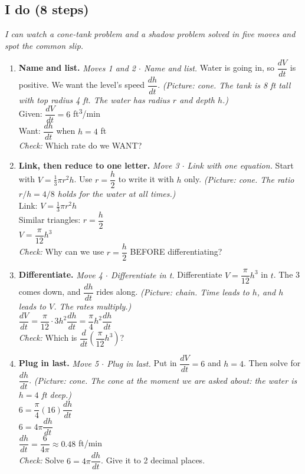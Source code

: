 \documentclass[11pt]{article}
\begin{document}
\subsection*{I do (8 steps)}
\textit{I can watch a cone-tank problem and a shadow problem solved in five moves and spot the common slip.}\par
\begin{enumerate}
\item \textbf{Name and list.} \textit{Moves 1 and 2 $\cdot$ Name and list.} Water is going in, so $\dfrac{dV}{dt}$ is positive. We want the level's speed $\dfrac{dh}{dt}$. \textit{(Picture: cone. The tank is 8 ft tall with top radius 4 ft. The water has radius $r$ and depth $h$.)}\\ Given: $\dfrac{dV}{dt}=6$ ft\textsuperscript{3}/min\\ Want: $\dfrac{dh}{dt}$ when $h=4$ ft\\ \textit{Check:} Which rate do we WANT? 
\item \textbf{Link, then reduce to one letter.} \textit{Move 3 $\cdot$ Link with one equation.} Start with $V=\tfrac13\pi r^2h$. Use $r=\dfrac h2$ to write it with $h$ only. \textit{(Picture: cone. The ratio $r/h=4/8$ holds for the water at all times.)}\\ Link: $V=\tfrac13\pi r^2h$\\ Similar triangles: $r=\dfrac h2$\\ $V=\dfrac{\pi}{12}h^3$\\ \textit{Check:} Why can we use $r=\dfrac h2$ BEFORE differentiating? 
\item \textbf{Differentiate.} \textit{Move 4 $\cdot$ Differentiate in t.} Differentiate $V=\dfrac{\pi}{12}h^3$ in $t$. The 3 comes down, and $\dfrac{dh}{dt}$ rides along. \textit{(Picture: chain. Time leads to $h$, and $h$ leads to $V$. The rates multiply.)}\\ $\dfrac{dV}{dt}=\dfrac{\pi}{12}\cdot3h^2\dfrac{dh}{dt}=\dfrac{\pi}{4}h^2\dfrac{dh}{dt}$\\ \textit{Check:} Which is $\dfrac{d}{dt}\left(\dfrac{\pi}{12}h^3\right)$? 
\item \textbf{Plug in last.} \textit{Move 5 $\cdot$ Plug in last.} Put in $\dfrac{dV}{dt}=6$ and $h=4$. Then solve for $\dfrac{dh}{dt}$. \textit{(Picture: cone. The cone at the moment we are asked about: the water is $h=4$ ft deep.)}\\ $6=\dfrac{\pi}{4}(16)\dfrac{dh}{dt}$\\ $6=4\pi\dfrac{dh}{dt}$\\ $\dfrac{dh}{dt}=\dfrac{6}{4\pi}\approx0.48$ ft/min\\ \textit{Check:} Solve $6=4\pi\dfrac{dh}{dt}$. Give it to 2 decimal places. 

\end{enumerate}
\end{document}
